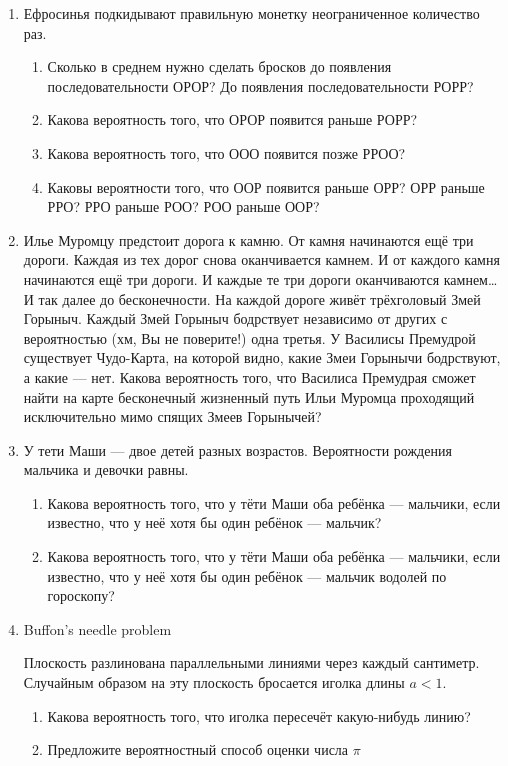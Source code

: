 \documentclass[nobib]{tufte-handout}
\begin{document}
\begin{enumerate}
\item Ефросинья подкидывают правильную монетку неограниченное количество раз. 

\begin{enumerate}
\item Сколько в среднем нужно сделать бросков до появления последовательности ОРОР? До появления последовательности РОРР?
\item Какова вероятность того, что ОРОР появится раньше РОРР?
\item Какова вероятность того, что ООО появится позже РРОО?
\item Каковы вероятности того, что ООР появится раньше ОРР? ОРР раньше РРО? РРО раньше РОО? РОО раньше ООР?
\end{enumerate}

\item Илье Муромцу предстоит дорога к камню. От камня начинаются ещё три дороги. Каждая из тех дорог снова оканчивается камнем. И от каждого камня начинаются ещё три дороги. И каждые те три дороги оканчиваются камнем\ldots И так далее до бесконечности. На каждой дороге живёт трёхголовый Змей Горыныч. Каждый Змей Горыныч бодрствует независимо от других с вероятностью (хм, Вы не поверите!) одна третья. У Василисы Премудрой существует Чудо-Карта, на которой видно, какие Змеи Горынычи бодрствуют, а какие --- нет. Какова вероятность того, что Василиса Премудрая сможет найти на карте  бесконечный жизненный путь Ильи Муромца проходящий исключительно мимо спящих Змеев Горынычей?

\item У тети Маши --- двое детей разных возрастов. Вероятности рождения мальчика и девочки равны. 

\begin{enumerate}
\item Какова вероятность того, что у тёти Маши оба ребёнка --- мальчики, если известно, что у неё хотя бы один ребёнок --- мальчик?
\item Какова вероятность того, что у тёти Маши оба ребёнка --- мальчики, если известно, что у неё хотя бы один ребёнок --- мальчик водолей по гороскопу?
\end{enumerate}

\item Buffon's needle problem

Плоскость разлинована параллельными линиями через каждый сантиметр. Случайным образом на эту плоскость бросается иголка длины $a<1$. 

\begin{enumerate}
\item Какова вероятность того, что иголка пересечёт какую-нибудь линию?
\item Предложите вероятностный способ оценки числа $\pi$
\end{enumerate}


\end{enumerate}
\end{document}
